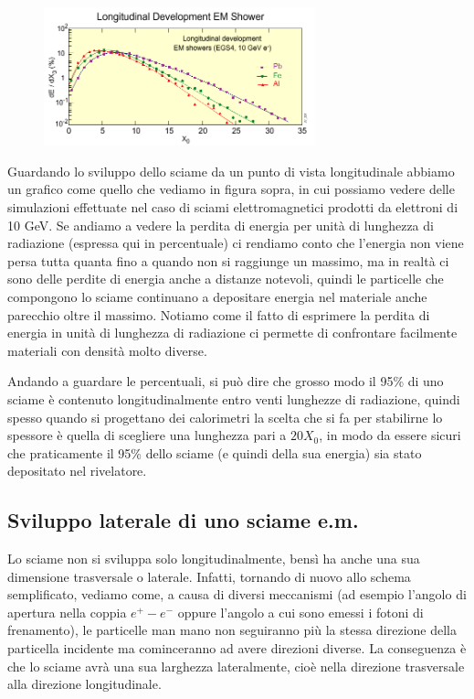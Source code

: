 \begin{figure}[H]
    \centering
    \includegraphics[width=0.7\textwidth]{immagini/grafico_longitudinale.png}
\end{figure}

Guardando lo sviluppo dello sciame da un punto di vista longitudinale abbiamo un grafico come quello che vediamo in figura sopra, in cui possiamo vedere delle simulazioni effettuate nel caso di sciami elettromagnetici prodotti da elettroni di 10 GeV. Se andiamo a vedere la perdita di energia per unità di lunghezza di radiazione (espressa qui in percentuale) ci rendiamo conto che l'energia non viene persa tutta quanta fino a quando non si raggiunge un massimo, ma in realtà ci sono delle perdite di energia anche a distanze notevoli, quindi le particelle che compongono lo sciame continuano a depositare energia nel materiale anche parecchio oltre il massimo. Notiamo come il fatto di esprimere la perdita di energia in unità di lunghezza di radiazione ci permette di confrontare facilmente materiali con densità molto diverse.

Andando a guardare le percentuali, si può dire che grosso modo il 95\% di uno sciame è contenuto longitudinalmente entro venti lunghezze di radiazione, quindi spesso quando si progettano dei calorimetri la scelta che si fa per stabilirne lo spessore è quella di scegliere una lunghezza pari a $20X_0$, in modo da essere sicuri che praticamente il 95\% dello sciame (e quindi della sua energia) sia stato depositato nel rivelatore.

\subsection{Sviluppo laterale di uno sciame e.m.}
Lo sciame non si sviluppa solo longitudinalmente, bensì ha anche una sua dimensione trasversale o laterale. Infatti, tornando di nuovo allo schema semplificato, vediamo come, a causa di diversi meccanismi (ad esempio l'angolo di apertura nella coppia $e^+ - e^-$ oppure l'angolo a cui sono emessi i fotoni di frenamento), le particelle man mano non seguiranno più la stessa direzione della particella incidente ma cominceranno ad avere direzioni diverse. La conseguenza è che lo sciame avrà una sua larghezza lateralmente, cioè nella direzione trasversale alla direzione longitudinale.

